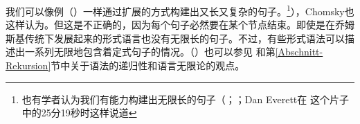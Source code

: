 \noindent
我们可以像例（）一样通过扩展的方式构建出又长又复杂的句子。\footnote{%
也有学者认为我们有能力构建出无限长的句子（\citealp*[]{NKN2001a}；\citealp[]{KS2008a-u}；Dan Everett在 这个片子中的25分19秒时这样说道}），Chomsky也这样认为\citep[]{Leiss2003a}。但这是不正确的，因为每个句子必然要在某个节点结束。即使是在乔姆斯基传统下发展起来的形式语言也没有无限长的句子。不过，有些形式语法可以描述出一系列无限地包含着定式句子的情况。（\citealp[]{Chomsky57a}）也可以参见 和第\ref{Abschnitt-Rekursion}节中关于语法的递归性和语言无限论的观点。


